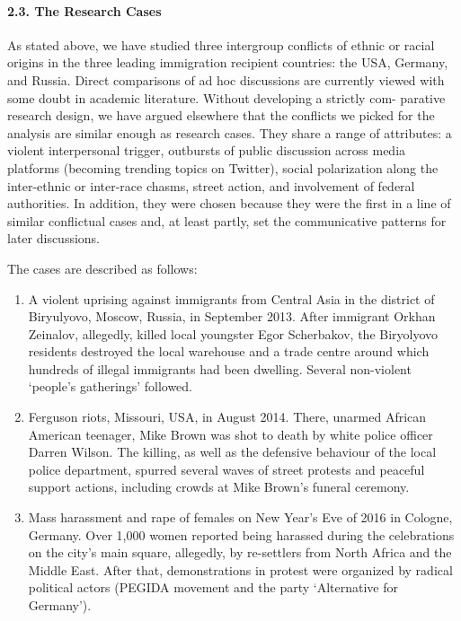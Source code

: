 \paragraph{2.3. The Research Cases}

As stated above, we have studied three intergroup conflicts of ethnic or racial origins in the three leading immigration recipient countries: the USA, Germany, and Russia. Direct comparisons of ad hoc discussions \cite{BrunsBurgess} are currently viewed with some doubt in academic literature. Without developing a strictly com- parative research design, we have argued elsewhere \cite{BodrunovaLitvinenkoBlekanov2017,BodrunovaBlekanovMaksimov} that the conflicts we picked for the analysis are similar enough as research cases. They share a range of attributes: a violent interpersonal trigger, outbursts of public discussion across media platforms (becoming trending topics on Twitter), social polarization along the inter-ethnic or inter-race chasms, street action, and involvement of federal authorities. In addition, they were chosen because they were the first in a line of similar conflictual cases and, at least partly, set the communicative patterns for later discussions.

The cases are described as follows:
\begin{enumerate}
	\item A violent uprising against immigrants from Central Asia in the district of Biryulyovo, Moscow, Russia, in September 2013. After immigrant Orkhan Zeinalov, allegedly, killed local youngster Egor Scherbakov, the Biryolyovo residents destroyed the local warehouse and a trade centre around which hundreds of illegal immigrants had been dwelling. Several non-violent ‘people’s gatherings’ followed.
	
	\item Ferguson riots, Missouri, USA, in August 2014. There, unarmed African American teenager, Mike Brown was shot to death by white police officer Darren Wilson. The killing, as well as the defensive behaviour of the local police department, spurred several waves of street protests and peaceful support actions, including crowds at Mike Brown’s funeral ceremony.
	
	\item Mass harassment and rape of females on New Year’s Eve of 2016 in Cologne, Germany. Over 1,000 women reported being harassed during the celebrations on the city’s main square, allegedly, by re-settlers from North Africa and the Middle East. After that, demonstrations in protest were organized by radical political actors (PEGIDA movement and the party ‘Alternative for Germany’).
\end{enumerate}

